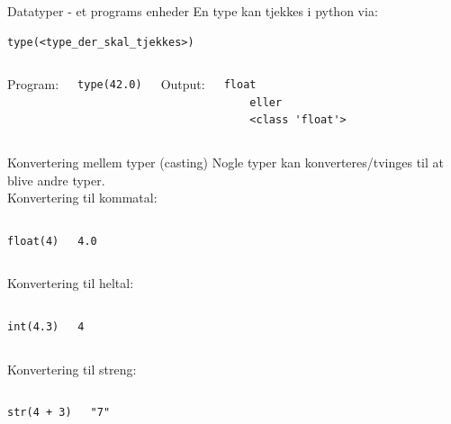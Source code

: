 \documentclass{beamer}
\begin{document}
\begin{frame}[fragile]{Datatyper - et programs enheder}
En type kan tjekkes i python via:
\begin{lstlisting}[style=python]
type(<type_der_skal_tjekkes>)
\end{lstlisting}

\begin{columns}
	Program:
	\begin{lstlisting}[style=python]
	type(42.0)
	\end{lstlisting}
	
	Output:
	\begin{lstlisting}[style=python]
	float
	eller
	<class 'float'>
	\end{lstlisting}
\end{columns}

\end{frame}

\begin{frame}[fragile]{Konvertering mellem typer (casting)}
Nogle typer kan konverteres/tvinges til at blive andre typer.\\
Konvertering til kommatal:
\begin{columns}
\begin{lstlisting}[style=python]
float(4)
\end{lstlisting}
\begin{lstlisting}[style=python]
4.0
\end{lstlisting}
\end{columns}
Konvertering til heltal:
\begin{columns}
\begin{lstlisting}[style=python]
int(4.3)
\end{lstlisting}
\begin{lstlisting}[style=python]
4
\end{lstlisting}
\end{columns}
Konvertering til streng:
\begin{columns}
\begin{lstlisting}[style=python]
str(4 + 3)
\end{lstlisting}
\begin{lstlisting}[style=python]
"7"
\end{lstlisting}
\end{columns}
\end{frame}
\end{document}

